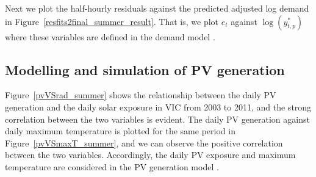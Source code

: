 \documentclass[11pt]{article}
\begin{document}






Next we plot the half-hourly residuals against the predicted adjusted log demand in Figure~\ref{resfits2final_summer_result}. That is, we plot
$e_t$ against $\log(y^*_{t,p})$ where these variables are defined in the demand model \citep{Tech15}.





\subsection{Modelling and simulation of PV generation}

Figure~\ref{pvVSrad_summer} shows the relationship between the daily PV generation and the daily solar exposure in VIC from 2003 to 2011, and the strong correlation between the two variables is evident. The daily PV generation against daily maximum temperature is plotted for the same period in Figure~\ref{pvVSmaxT_summer}, and we can observe the positive correlation between the two variables. Accordingly, the daily PV exposure and maximum temperature are considered in the PV generation model \citep{Tech15}.
\end{document}
